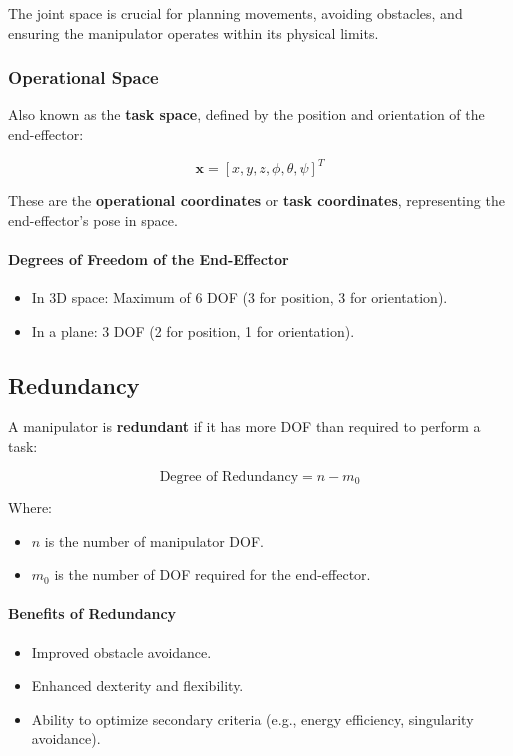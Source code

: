 \documentclass{article}
\begin{document}
The joint space is crucial for planning movements, avoiding obstacles, and ensuring the manipulator operates within its physical limits.

\subsubsection{Operational Space}

Also known as the \textbf{task space}, defined by the position and orientation of the end-effector:

$$
\mathbf{x} = [x, y, z, \phi, \theta, \psi]^T
$$

These are the \textbf{operational coordinates} or \textbf{task coordinates}, representing the end-effector's pose in space.

\paragraph{Degrees of Freedom of the End-Effector}

\begin{itemize}
    \item In 3D space: Maximum of 6 DOF (3 for position, 3 for orientation).
    \item In a plane: 3 DOF (2 for position, 1 for orientation).
\end{itemize}

\subsection{Redundancy}

A manipulator is \textbf{redundant} if it has more DOF than required to perform a task:

$$
\text{Degree of Redundancy} = n - m_0
$$

Where:

\begin{itemize}
    \item $n$ is the number of manipulator DOF.
    \item $m_0$ is the number of DOF required for the end-effector.
\end{itemize}

\paragraph{Benefits of Redundancy}

\begin{itemize}
    \item Improved obstacle avoidance.
    \item Enhanced dexterity and flexibility.
    \item Ability to optimize secondary criteria (e.g., energy efficiency, singularity avoidance).
\end{itemize}
\end{document}
